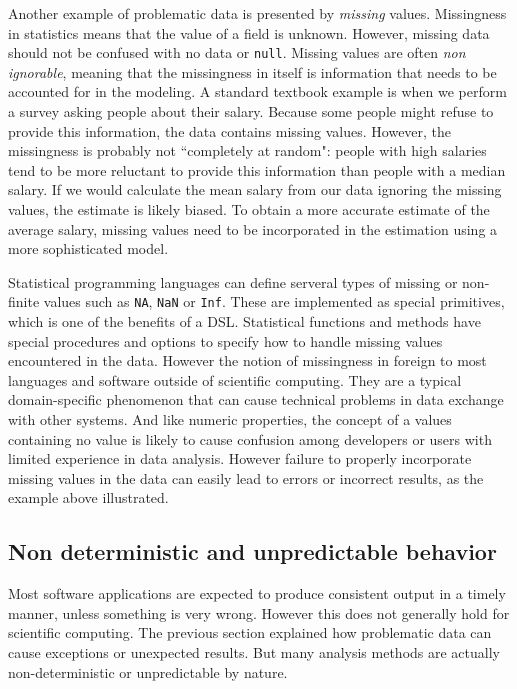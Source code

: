 \documentclass{article}
\begin{document}
Another example of problematic data is presented by \emph{missing} values. Missingness in statistics means that the value of a field is unknown. However, missing data should not be confused with no data or \texttt{null}. Missing values are often \emph{non ignorable}, meaning that the missingness in itself is information that needs to be accounted for in the modeling. A standard textbook example is when we perform a survey asking people about their salary. Because some people might refuse to provide this information, the data contains missing values. However, the missingness is probably not ``completely at random": people with high salaries tend to be more reluctant to provide this information than people with a median salary. If we would calculate the mean salary from our data ignoring the missing values, the estimate is likely biased. To obtain a more accurate estimate of the average salary, missing values need to be incorporated in the estimation using a more sophisticated model. 

Statistical programming languages can define serveral types of missing or non-finite values such as \texttt{NA}, \texttt{NaN} or \texttt{Inf}. These are implemented as special primitives, which is one of the benefits of a DSL. Statistical functions and methods have special procedures and options to specify how to handle missing values encountered in the data. However the notion of missingness in foreign to most languages and software outside of scientific computing. They are a typical domain-specific phenomenon that can cause technical problems in data exchange with other systems. And like numeric properties, the concept of a values containing no value is likely to cause confusion among developers or users with limited experience in data analysis. However failure to properly incorporate missing values in the data can easily lead to errors or incorrect results, as the example above illustrated.

\subsection{Non deterministic and unpredictable behavior}

Most software applications are expected to produce consistent output in a timely manner, unless something is very wrong. However this does not generally hold for scientific computing. The previous section explained how problematic data can cause exceptions or unexpected results. But many analysis methods are actually non-deterministic or unpredictable by nature.
\end{document}
